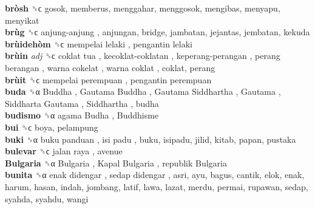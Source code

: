\textbf{bròsh} ␝ϲ  gosok, memberus, menggahar, menggosok, mengibas, menyapu, menyikat  \\
\textbf{brùg} ␝ϲ   anjung-anjung , anjungan, bridge, jambatan, jejantas, jembatan, kekuda  \\
\textbf{brùidehòm} ␝ϲ   mempelai lelaki ,  pengantin lelaki   \\
\textbf{brùin} \emph{adj}  ␝ϲ   coklat tua ,  kecoklat-coklatan ,  keperang-perangan ,  perang berangan ,  warna cokelat ,  warna coklat , coklat, perang  \\
\textbf{brùit} ␝ϲ   mempelai perempuan ,  pengantin perempuan   \\
\textbf{buda} ␝α   Buddha ,  Gautama Buddha ,  Gautama Siddhartha ,  Gautama ,  Siddharta Gautama ,  Siddhartha , budha  \\
\textbf{budismo} ␝α   agama Budha ,  Buddhisme   \\
\textbf{bui} ␝ϲ  boya, pelampung  \\
\textbf{buki} ␝α   buku panduan ,  isi padu , buku, isipadu, jilid, kitab, papan, pustaka  \\
\textbf{bulevar} ␝ϲ   jalan raya , avenue  \\
\textbf{Bulgaria} ␝α   Bulgaria ,  Kapal Bulgaria ,  republik Bulgaria   \\
\textbf{bunita} ␝α   enak didengar ,  sedap didengar , asri, ayu, bagus, cantik, elok, enak, harum, hasan, indah, jombang, latif, lawa, lazat, merdu, permai, rupawan, sedap, syahda, syahdu, wangi  \\
